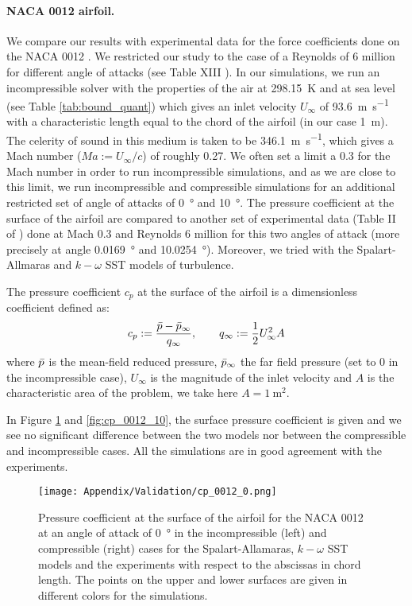 \begin{subappendices}
	\paragraph{NACA 0012 airfoil.} We compare our results with experimental data for the force coefficients done on the \acrshort{NACA} 0012 \cite{NACA0012-1, NACA0012-2}. We restricted our study to the case of a Reynolds of 6 million for different angle of attacks (see Table XIII \cite{NACA0012-2}). In our simulations, we run an incompressible solver with the properties of the air at \SI{298.15}{\kelvin} and at sea level (see Table \ref{tab:bound_quant}) which gives an inlet velocity $U_\infty$ of \SI{93.6}{\meter\per\second} with a characteristic length equal to the chord of the airfoil (in our case \SI{1}{\meter}). The celerity of sound in this medium is taken to be \SI{346.1}{\meter\per\second}, which gives a Mach number ($Ma := U_\infty/c$) of roughly 0.27. We often set a limit a 0.3 for the Mach number in order to run incompressible simulations, and as we are close to this limit, we run incompressible and compressible simulations for an additional restricted set of angle of attacks of \SI{0}{\degree} and \SI{10}{\degree}. The pressure coefficient at the surface of the airfoil are compared to another set of experimental data (Table II of \cite{NACA0012-1}) done at Mach 0.3 and Reynolds 6 million for this two angles of attack (more precisely at angle \SI{0.0169}{\degree} and \SI{10.0254}{\degree}). Moreover, we tried with the Spalart-Allmaras and $k-\omega$ SST models of turbulence.
	
	The pressure coefficient $c_p$ at the surface of the airfoil is a dimensionless coefficient defined as:
	\begin{align}
		c_p := \frac{\Bar{p}-\Bar{p}_\infty}{q_\infty}, \qquad q_\infty := \frac{1}{2}U_\infty^2 A
	\end{align}
	where $\Bar{p}$ is the mean-field reduced pressure, $\Bar{p}_\infty$ the far field pressure (set to 0 in the incompressible case), $U_\infty$ is the magnitude of the inlet velocity and $A$ is the characteristic area of the problem, we take here $A = \SI{1}{\square\meter}$.
	
	In Figure \ref{fig:cp_0012_0} and \ref{fig:cp_0012_10}, the surface pressure coefficient is given and we see no significant difference between the two models nor between the compressible and incompressible cases. All the simulations are in good agreement with the experiments.
	
	\begin{figure}
		\centering
		\texttt{[image: Appendix/Validation/cp\_0012\_0.png]}
		\caption[Pressure coefficient for a \acrshort{NACA} 0012 at \SI{0}{\degree}.]{Pressure coefficient at the surface of the airfoil for the \acrshort{NACA} 0012 at an angle of attack of \SI{0}{\degree} in the incompressible (left) and compressible (right) cases for the Spalart-Allamaras,  $k-\omega$ SST models and the experiments with respect to the abscissas in chord length. The points on the upper and lower surfaces are given in different colors for the simulations.}
		\label{fig:cp_0012_0}
	\end{figure}
	

\end{subappendices}
